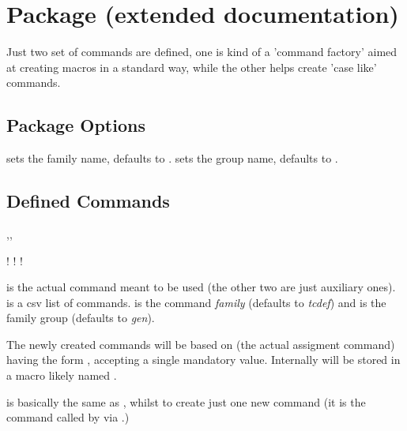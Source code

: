 \documentclass[dctools,english,tocdepth=3,secdepth=3]{ufrgscca} %
\newif\iffulldoc
\begin{document}
\iffulldoc
\section{ Package (extended documentation)}
Just two set of commands are defined, one is kind of a 'command factory' aimed at creating macros in a standard way, while the other helps create 'case like' commands.


\subsection{Package Options}
\begin{Options}
	 sets the family name, defaults to .
	 sets the group name, defaults to .
\end{Options}

\subsection{Defined Commands}
\begin{Macros}{\cmdfactory,\factory,\tcgen@cdef}
	\begin{Syntax}%
		\Macro!{\cmdfactory}{}
		\Macro!{\factory}{}
		\Macro!{\tcgen@cdef}{}
	\end{Syntax}
	\Macro{\cmdfactory}{} is the actual command meant to be used (the other two are just auxiliary ones).  is a csv list of commands.  is the command \emph{family} (defaults to \emph{tcdef}) and  is the family group (defaults to \emph{gen}).

	The newly created commands will be based on \Macro{\tcgen@cdef}{} (the actual assigment command) having the form , accepting a single mandatory value. Internally  will be stored in a macro likely named \Macro{\fam@grp@cmd}{}.

    \Macro{\factory}{} is basically the same as \Macro{\cmdfactory}{}, whilst to create just one new command (it is the command called by \Macro{\cmdfactory}{} via \Macro{\forcsvlist}{}.)
\end{Macros}
\end{document}
